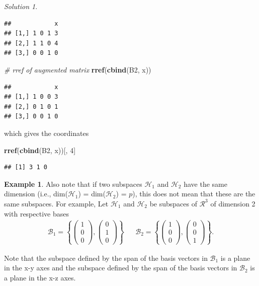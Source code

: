 \documentclass[
]{book}
\newenvironment{Shaded}{\begin{snugshade}}{\end{snugshade}}
\newcommand{\CommentTok}[1]{\textcolor[rgb]{0.56,0.35,0.01}{\textit{#1}}}
\newcommand{\DecValTok}[1]{\textcolor[rgb]{0.00,0.00,0.81}{#1}}
\newcommand{\KeywordTok}[1]{\textcolor[rgb]{0.13,0.29,0.53}{\textbf{#1}}}
\newcommand{\NormalTok}[1]{#1}
\theoremstyle{definition}
\theoremstyle{definition}
\newtheorem{example}{Example}[chapter]
\theoremstyle{definition}
\theoremstyle{definition}
\theoremstyle{remark}
\newtheorem*{solution}{Solution}
\begin{document}
\begin{solution}
\begin{verbatim}
##            x
## [1,] 1 0 1 3
## [2,] 1 1 0 4
## [3,] 0 0 1 0
\end{verbatim}

\begin{Shaded}
\begin{Highlighting}[]
\CommentTok{# rref of augmented matrix}
\KeywordTok{rref}\NormalTok{(}\KeywordTok{cbind}\NormalTok{(B2, x))}
\end{Highlighting}
\end{Shaded}

\begin{verbatim}
##            x
## [1,] 1 0 0 3
## [2,] 0 1 0 1
## [3,] 0 0 1 0
\end{verbatim}

which gives the coordinates

\begin{Shaded}
\begin{Highlighting}[]
\KeywordTok{rref}\NormalTok{(}\KeywordTok{cbind}\NormalTok{(B2, x))[, }\DecValTok{4}\NormalTok{]}
\end{Highlighting}
\end{Shaded}

\begin{verbatim}
## [1] 3 1 0
\end{verbatim}

\end{solution}

\begin{example}
Also note that if two subspaces \(\mathcal{H}_1\) and \(\mathcal{H}_2\) have the same dimension (i.e., dim(\(\mathcal{H}_1\)) = dim(\(\mathcal{H}_2\)) = \(p\)), this does not mean that these are the same subspaces. For example, Let \(\mathcal{H}_1\) and \(\mathcal{H}_2\) be subspaces of \(\mathcal{R}^3\) of dimension 2 with respective bases
\[
\begin{aligned}
\mathcal{B}_1 = \left\{ \begin{pmatrix} 1 \\ 0 \\ 0 \end{pmatrix}, \begin{pmatrix} 0 \\ 1 \\ 0 \end{pmatrix} \right\} && \mathcal{B}_2 = \left\{ \begin{pmatrix} 1 \\ 0 \\ 0 \end{pmatrix}, \begin{pmatrix} 0 \\ 0 \\ 1 \end{pmatrix} \right\}. 
\end{aligned}
\]

Note that the subspace defined by the span of the basis vectors in \(\mathcal{B}_1\) is a plane in the x-y axes and the subspace defined by the span of the basis vectors in \(\mathcal{B}_2\) is a plane in the x-z axes.
\end{example}
\end{document}
